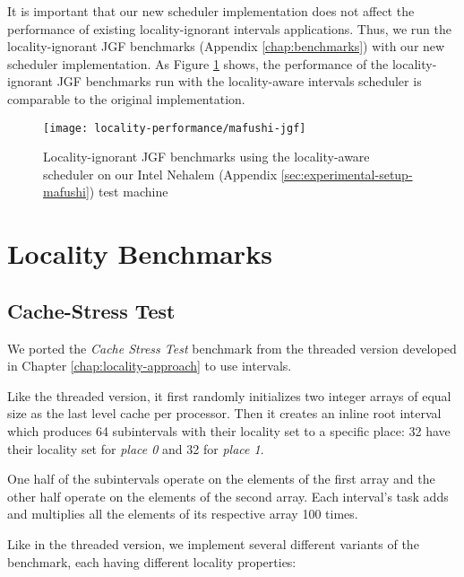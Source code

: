 It is important that our new scheduler implementation does not affect
the performance of existing locality-ignorant intervals
applications. Thus, we run the locality-ignorant JGF benchmarks
(Appendix \ref{chap:benchmarks}) with our new scheduler
implementation. As Figure \ref{fig:locality-performance-jgf} shows,
the performance of the locality-ignorant JGF benchmarks run with the
locality-aware intervals scheduler is comparable to the original
implementation.

\begin{figure}[!ht]
  \centering
  \texttt{[image: locality-performance/mafushi-jgf]}
  \caption[Locality-ignorant JGF benchmarks running on locality-aware
  scheduler]{Locality-ignorant JGF benchmarks using the locality-aware
    scheduler on our Intel Nehalem (Appendix
    \ref{sec:experimental-setup-mafushi}) test machine}
  \label{fig:locality-performance-jgf}
\end{figure}


\section{Locality Benchmarks}
\label{sec:locality-performance-locality}

\subsection{Cache-Stress Test}
\label{sec:locality-performance-cache-stress-test}

We ported the \emph{Cache Stress Test} benchmark from the threaded
version developed in Chapter \ref{chap:locality-approach} to use
intervals.

Like the threaded version, it first randomly initializes two integer
arrays of equal size as the last level cache per processor. Then it
creates an inline root interval which produces 64 subintervals with
their locality set to a specific place: 32 have their locality set for
\emph{place 0} and 32 for \emph{place 1}.

One half of the subintervals operate on the elements of the first
array and the other half operate on the elements of the second
array. Each interval's task adds and multiplies all the elements of
its respective array 100 times.

Like in the threaded version, we implement several different variants
of the benchmark, each having different locality properties:

